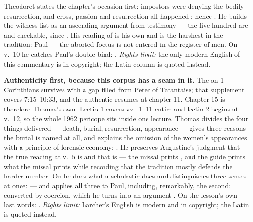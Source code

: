 \begin{witnessnote}
Theodoret states the chapter's occasion first: impostors were denying the
bodily resurrection, and cross, passion and resurrection all happened
; hence . He builds the
witness list as an ascending argument from testimony --- the five hundred are
 and checkable, since . His reading of  is his own and is the harshest in the
tradition: Paul  --- the aborted foetus is not entered in the register of men.
On v.~10 he catches Paul's double bind: . \textit{Rights limit:} the only modern
English of this commentary is in copyright; the Latin column is quoted instead.
\end{witnessnote}

\begin{witnessnote}
\textbf{Authenticity first, because this corpus has a seam in it.} The
 on 1 Corinthians survives with a gap filled from Peter of
Tarantaise; that supplement covers 7:15--10:33, and the authentic
 resumes at chapter 11. Chapter 15 is therefore
Thomas's own. Lectio 1 covers vv.~1--11 entire and lectio 2 begins at v.~12, so
the whole 1962 pericope sits inside one lecture. Thomas divides the four things
delivered --- death, burial, resurrection, appearance --- gives three reasons
the burial is named at all, and explains the omission of the women's
appearances with a principle of forensic economy: . He preserves Augustine's judgment that the true
reading at v.~5 is  and that  is  --- the missal prints , and the guide
prints what the missal prints while recording that the tradition mostly defends
the harder number. On  he does what a scholastic does and
distinguishes three senses at once:  --- and applies all three to Paul, including, remarkably, the
second: converted by coercion, which he turns into an argument
. On the lesson's own last words: . \textit{Rights limit:} Larcher's English is modern and in
copyright; the Latin is quoted instead.
\end{witnessnote}

